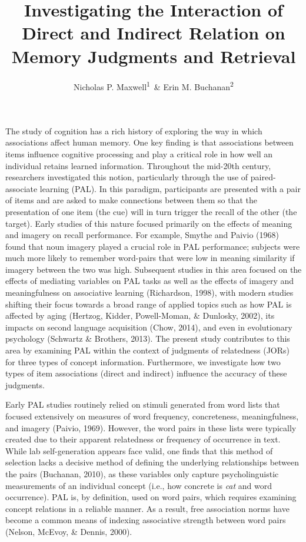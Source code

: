 \documentclass[english,,man]{apa6}
\title{Investigating the Interaction of Direct and Indirect Relation on Memory Judgments and Retrieval}
\author{Nicholas P. Maxwell\textsuperscript{1}~\& Erin M. Buchanan\textsuperscript{2}}
\date{}
\affiliation{
\vspace{0.5cm}
\textsuperscript{1} University of Southern Mississippi\\\textsuperscript{2} Harrisburg University of Science and Technology}
\begin{document}
\maketitle

The study of cognition has a rich history of exploring the way in which associations affect human memory. One key finding is that associations between items influence cognitive processing and play a critical role in how well an individual retains learned information. Throughout the mid-20th century, researchers investigated this notion, particularly through the use of paired-associate learning (PAL). In this paradigm, participants are presented with a pair of items and are asked to make connections between them so that the presentation of one item (the cue) will in turn trigger the recall of the other (the target). Early studies of this nature focused primarily on the effects of meaning and imagery on recall performance. For example, Smythe and Paivio (1968) found that noun imagery played a crucial role in PAL performance; subjects were much more likely to remember word-pairs that were low in meaning similarity if imagery between the two was high. Subsequent studies in this area focused on the effects of mediating variables on PAL tasks as well as the effects of imagery and meaningfulness on associative learning (Richardson, 1998), with modern studies shifting their focus towards a broad range of applied topics such as how PAL is affected by aging (Hertzog, Kidder, Powell-Moman, \& Dunlosky, 2002), its impacts on second language acquisition (Chow, 2014), and even in evolutionary psychology (Schwartz \& Brothers, 2013). The present study contributes to this area by examining PAL within the context of judgments of relatedness (JORs) for three types of concept information. Furthermore, we investigate how two types of item associations (direct and indirect) influence the accuracy of these judgments.

Early PAL studies routinely relied on stimuli generated from word lists that focused extensively on measures of word frequency, concreteness, meaningfulness, and imagery (Paivio, 1969). However, the word pairs in these lists were typically created due to their apparent relatedness or frequency of occurrence in text. While lab self-generation appears face valid, one finds that this method of selection lacks a decisive method of defining the underlying relationships between the pairs (Buchanan, 2010), as these variables only capture psycholinguistic measurements of an individual concept (i.e., how concrete is \emph{cat} and word occurrence). PAL is, by definition, used on word pairs, which requires examining concept relations in a reliable manner. As a result, free association norms have become a common means of indexing associative strength between word pairs (Nelson, McEvoy, \& Dennis, 2000).
\end{document}
